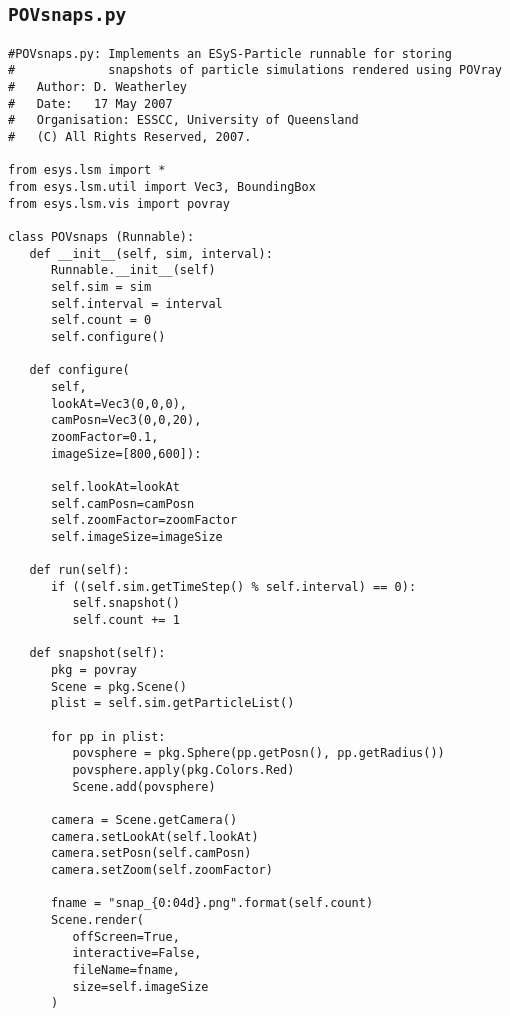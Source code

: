 \subsection{\texttt{POVsnaps.py}}\label{code:POVsnaps}

\begin{verbatim}
#POVsnaps.py: Implements an ESyS-Particle runnable for storing 
#             snapshots of particle simulations rendered using POVray
#	Author: D. Weatherley
#	Date:	17 May 2007
#	Organisation: ESSCC, University of Queensland
#	(C) All Rights Reserved, 2007.

from esys.lsm import *
from esys.lsm.util import Vec3, BoundingBox
from esys.lsm.vis import povray

class POVsnaps (Runnable):
   def __init__(self, sim, interval):
      Runnable.__init__(self)
      self.sim = sim
      self.interval = interval
      self.count = 0
      self.configure()

   def configure(
      self, 
      lookAt=Vec3(0,0,0), 
      camPosn=Vec3(0,0,20), 
      zoomFactor=0.1, 
      imageSize=[800,600]):

      self.lookAt=lookAt
      self.camPosn=camPosn
      self.zoomFactor=zoomFactor
      self.imageSize=imageSize

   def run(self):
      if ((self.sim.getTimeStep() % self.interval) == 0):
         self.snapshot()
         self.count += 1

   def snapshot(self):
      pkg = povray
      Scene = pkg.Scene()
      plist = self.sim.getParticleList()

      for pp in plist:
         povsphere = pkg.Sphere(pp.getPosn(), pp.getRadius())
         povsphere.apply(pkg.Colors.Red)
         Scene.add(povsphere)

      camera = Scene.getCamera()
      camera.setLookAt(self.lookAt)
      camera.setPosn(self.camPosn)
      camera.setZoom(self.zoomFactor)

      fname = "snap_{0:04d}.png".format(self.count)
      Scene.render(
         offScreen=True, 
         interactive=False, 
         fileName=fname, 
         size=self.imageSize
      )
\end{verbatim}

